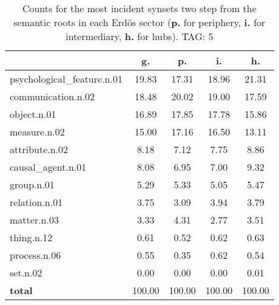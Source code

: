 \begin{table}[h!]
\begin{center}
\begin{tabular}{| l || c | c | c | c |}\hline
 & {\bf g.} & {\bf p.} & {\bf i.} & {\bf h.} \\\hline\hline
psychological\_feature.n.01 & 19.83  & 17.31  & 18.96  & 21.31 \\\hline
communication.n.02 & 18.48  & 20.02  & 19.00  & 17.59 \\\hline
object.n.01 & 16.89  & 17.85  & 17.78  & 15.86 \\\hline
measure.n.02 & 15.00  & 17.16  & 16.50  & 13.11 \\\hline
attribute.n.02 & 8.18  & 7.12  & 7.75  & 8.86 \\\hline
causal\_agent.n.01 & 8.08  & 6.95  & 7.00  & 9.32 \\\hline
group.n.01 & 5.29  & 5.33  & 5.05  & 5.47 \\\hline
relation.n.01 & 3.75  & 3.09  & 3.94  & 3.79 \\\hline
matter.n.03 & 3.33  & 4.31  & 2.77  & 3.51 \\\hline
thing.n.12 & 0.61  & 0.52  & 0.62  & 0.63 \\\hline
process.n.06 & 0.55  & 0.35  & 0.62  & 0.54 \\\hline
set.n.02 & 0.00  & 0.00  & 0.00  & 0.01 \\\hline\hline
{{\bf total}} & 100.00  & 100.00  & 100.00  & 100.00 \\\hline
\end{tabular}
\caption{Counts for the most incident synsets two step from the semantic roots in each Erd\"os sector ({\bf p.} for periphery, {\bf i.} for intermediary, {\bf h.} for hubs). TAG: 5}
\end{center}
\end{table}
